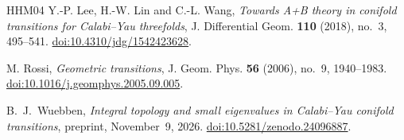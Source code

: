 \begin{thebibliography}{HHM04}
Y.-P. Lee, H.-W. Lin and C.-L. Wang,
\emph{Towards A+B theory in conifold transitions for Calabi--Yau threefolds},
J. Differential Geom. \textbf{110} (2018), no.~3, 495--541.
\href{https://doi.org/10.4310/jdg/1542423628}{doi:10.4310/jdg/1542423628}.

M. Rossi,
\emph{Geometric transitions},
J. Geom. Phys. \textbf{56} (2006), no.~9, 1940--1983.
\href{https://doi.org/10.1016/j.geomphys.2005.09.005}{doi:10.1016/j.geomphys.2005.09.005}.

B.~J.~Wuebben,
\emph{Integral topology and small eigenvalues in Calabi--Yau conifold
transitions},
preprint, November~9, 2026.
\href{https://doi.org/10.5281/zenodo.24096887}{doi:10.5281/zenodo.24096887}.

\end{thebibliography}
